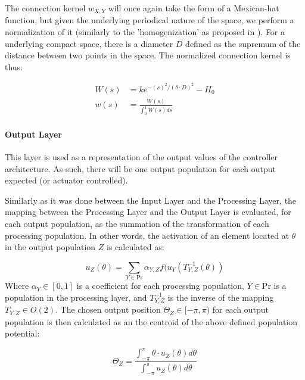 The connection kernel $w_{X,Y}$ will once again take the form of a
Mexican-hat function, but given the underlying periodical nature of
the space, we perform a normalization of it (similarly to the
'homogenization' as proposed in
\cite{Ermentrout98Neural}). For a underlying compact space, there is a
diameter $D$ defined as the supremum of the distance between two
points in the space. The normalized connection kernel is thus: 

\begin{align}
\label{eq:norm-kernel}
  W(s)&=ke^{-(s)^2/(\delta \cdot D)^2}-H_0\\
  w(s)&=\frac{W(s)}{\int_0^1W(s)ds}
\end{align}

\paragraph{Output Layer}
This layer is used as a representation of the output values of the
controller architecture. As such, there will be one output population
for each output expected (or actuator controlled).

Similarly as it was done between the Input Layer and the Processing
Layer, the mapping between the Processing Layer and the Output Layer
is evaluated, for each output population, as the summation of the
transformation of each processing population. In other words, the
activation of an element located at $\theta$ in the output population
$Z$ is calculated as:

\begin{equation}
  \label{eq:eqn-outlayer}
  u_Z(\theta)=\sum_{Y \in \mathrm{Pr}}\alpha_{Y,Z}f(u_Y(T_{Y,Z}^{-1}(\theta))
\end{equation}
Where $\alpha_Y \in [0,1]$ is a coefficient for each processing
population, $Y \in$Pr is a population in the processing layer, and
$T_{Y,Z}^{-1}$ is the inverse of the mapping $T_{Y,Z} \in O(2)$.
The chosen output position $\Theta_Z \in [-\pi,\pi)$ for each output
population is then calculated as an the centroid of the above defined
population potential:


\begin{equation}
  \label{eq:eqn-outpos}
  \Theta_Z=\frac{\int_{-\pi}^{\pi}\theta \cdot u_Z(\theta)d\theta}{\int_{-\pi}^{\pi}u_Z(\theta)d\theta}
\end{equation}

